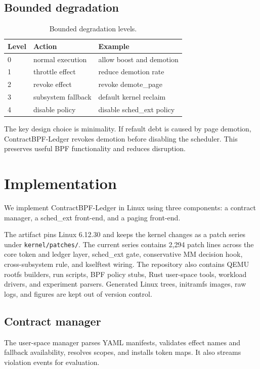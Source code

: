 \documentclass[letterpaper,twocolumn,10pt]{article}
\newcommand{\sys}{ContractBPF-Ledger\xspace}
\begin{document}
\subsection{Bounded degradation}

\begin{table}[t]
\centering
\caption{Bounded degradation levels.}
\begin{tabular}{lll}
\toprule
Level & Action & Example \\
\midrule
0 & normal execution & allow boost and demotion \\
1 & throttle effect & reduce demotion rate \\
2 & revoke effect & revoke demote\_page \\
3 & subsystem fallback & default kernel reclaim \\
4 & disable policy & disable sched\_ext policy \\
\bottomrule
\end{tabular}
\end{table}

The key design choice is minimality. If refault debt is caused by page demotion, \sys revokes demotion before disabling the scheduler. This preserves useful BPF functionality and reduces disruption.

\section{Implementation}

We implement \sys in Linux using three components: a contract manager, a sched\_ext front-end, and a paging front-end.

The artifact pins Linux 6.12.30 and keeps the kernel changes as a patch series
under \texttt{kernel/patches/}. The current series contains 2,294 patch lines
across the core token and ledger layer, sched\_ext gate, conservative MM
decision hook, cross-subsystem rule, and kselftest wiring. The repository also
contains QEMU rootfs builders, run scripts, BPF policy stubs, Rust user-space
tools, workload drivers, and experiment parsers. Generated Linux trees,
initramfs images, raw logs, and figures are kept out of version control.

\subsection{Contract manager}

The user-space manager parses YAML manifests, validates effect names and fallback availability, resolves scopes, and installs token maps. It also streams violation events for evaluation.
\end{document}
